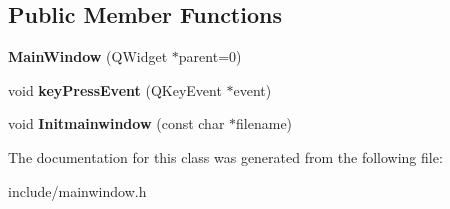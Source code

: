 \subsection*{Public Member Functions}
\begin{DoxyCompactItemize}
\item 
\hypertarget{class_main_window_a8b244be8b7b7db1b08de2a2acb9409db}{{\bfseries Main\-Window} (Q\-Widget $\ast$parent=0)}\label{class_main_window_a8b244be8b7b7db1b08de2a2acb9409db}

\item 
\hypertarget{class_main_window_a9c4f542263838b9ecd06eae839a42a34}{void {\bfseries key\-Press\-Event} (Q\-Key\-Event $\ast$event)}\label{class_main_window_a9c4f542263838b9ecd06eae839a42a34}

\item 
\hypertarget{class_main_window_a428d3fd1fd491107dacda4eebb5e0d16}{void {\bfseries Initmainwindow} (const char $\ast$filename)}\label{class_main_window_a428d3fd1fd491107dacda4eebb5e0d16}

\end{DoxyCompactItemize}


The documentation for this class was generated from the following file\-:\begin{DoxyCompactItemize}
\item 
include/mainwindow.\-h\end{DoxyCompactItemize}
